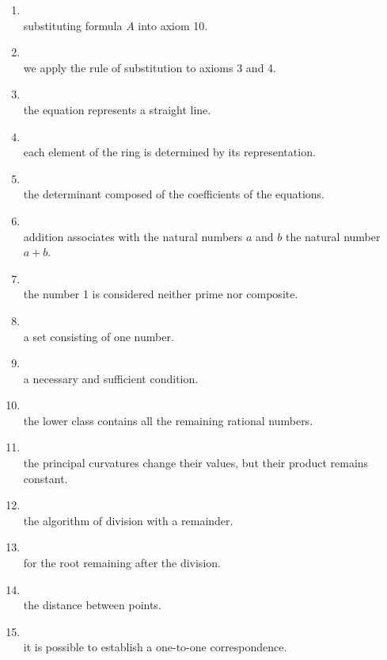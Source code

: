\begin{enumerate}[label=\arabic*)]
\item {}\\
      substituting formula $A$ into axiom 10.
\item {}\\
      we apply the rule of substitution to axioms 3 and 4.
\item {}\\
      the equation represents a straight line.
\item {}\\
      each element of the ring is determined by its representation.
\item {}\\
      the determinant composed of the coefficients of the equations.
\item {}\\
      addition associates with the natural numbers $a$ and $b$ the natural number $a+b$.
\item {}\\
      the number 1 is considered neither prime nor composite.
\item {}\\
      a set consisting of one number.
\item {}\\
      a necessary and sufficient condition.
\item {}\\
      the lower class contains all the remaining rational numbers.
\item {}\\
      the principal curvatures change their values, but their product remains constant.
\item {}\\
      the algorithm of division with a remainder.
\item {}\\
      for the root remaining after the division.
\item {}\\
      the distance between points.
\item {}\\
      it is possible to establish a one-to-one correspondence.
\end{enumerate}

